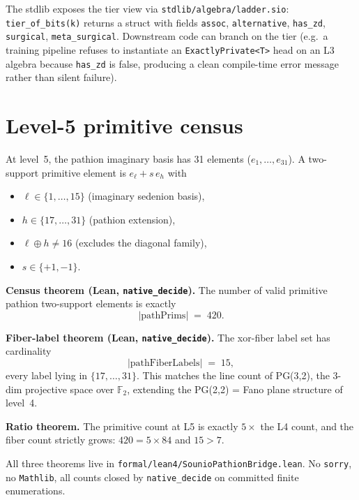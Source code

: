 \documentclass{article}
\begin{document}
The stdlib exposes the tier view via
\texttt{stdlib/algebra/ladder.sio}:
\texttt{tier\_of\_bits(k)} returns a struct with fields
\texttt{assoc}, \texttt{alternative}, \texttt{has\_zd},
\texttt{surgical}, \texttt{meta\_surgical}.
Downstream code can branch on the tier (e.g.\ a training pipeline
refuses to instantiate an \texttt{ExactlyPrivate<T>} head on an L3
algebra because \texttt{has\_zd} is false, producing a clean
compile-time error message rather than silent failure).

\section{Level-5 primitive census}

At level~5, the pathion imaginary basis has 31 elements
($e_1,\ldots,e_{31}$).  A two-support primitive element is
$e_\ell + s\,e_h$ with
\begin{itemize}
  \item $\ell \in \{1, \ldots, 15\}$ (imaginary sedenion basis),
  \item $h \in \{17, \ldots, 31\}$ (pathion extension),
  \item $\ell \oplus h \neq 16$ (excludes the diagonal family),
  \item $s \in \{+1, -1\}$.
\end{itemize}

\textbf{Census theorem (Lean, \texttt{native\_decide}).}  The number
of valid primitive pathion two-support elements is exactly
$$
|\text{pathPrims}| \;=\; 420.
$$

\textbf{Fiber-label theorem (Lean, \texttt{native\_decide}).} The
xor-fiber label set has cardinality
$$
|\text{pathFiberLabels}| \;=\; 15,
$$
every label lying in $\{17,\ldots,31\}$.  This matches the line
count of PG(3,2), the 3-dim projective space over $\mathbb F_2$,
extending the PG(2,2) = Fano plane structure of level~4.

\textbf{Ratio theorem.}  The primitive count at L5 is exactly
$5\times$ the L4 count, and the fiber count strictly grows:
$420 = 5\times 84$ and $15 > 7$.

All three theorems live in
\texttt{formal/lean4/SounioPathionBridge.lean}.  No \texttt{sorry},
no \texttt{Mathlib}, all counts closed by \texttt{native\_decide}
on committed finite enumerations.
\end{document}
